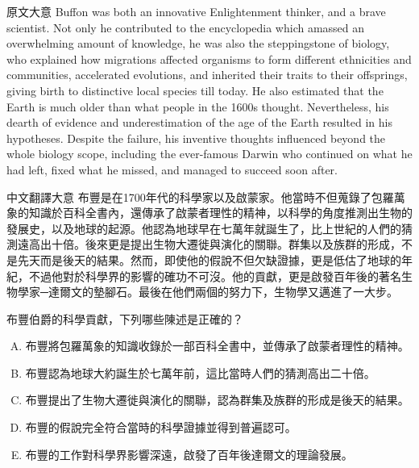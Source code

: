 \documentclass[
	a4paper,
	fontsize=11pt,
	twoside=true,
	numbers=noenddot,
]{article}
\begin{document}
\begin{large}
    \begin{boxpar}[SkyBlue]{原文大意}
Buffon was both an innovative Enlightenment thinker, and a brave
scientist. Not only he contributed to the encyclopedia which amassed an
overwhelming amount of knowledge, he was also the steppingstone of
biology, who explained how migrations affected organisms to form
different ethnicities and communities, accelerated evolutions, and
inherited their traits to their offsprings, giving birth to distinctive
local species till today. He also estimated that the Earth is much older
than what people in the 1600s thought. Nevertheless, his dearth of
evidence and underestimation of the age of the Earth resulted in his
hypotheses. Despite the failure, his inventive thoughts influenced
beyond the whole biology scope, including the ever-famous Darwin who
continued on what he had left, fixed what he missed, and managed to
succeed soon after.
\end{boxpar}
    \begin{boxpar}[SkyBlue]{中文翻譯大意}
布豐是在1700年代的科學家以及啟蒙家。他當時不但蒐錄了包羅萬象的知識於百科全書內，還傳承了啟蒙者理性的精神，以科學的角度推測出生物的發展史，以及地球的起源。他認為地球早在七萬年就誕生了，比上世紀的人們的猜測遠高出十倍。後來更是提出生物大遷徙與演化的關聯。群集以及族群的形成，不是先天而是後天的結果。然而，即使他的假說不但欠缺證據，更是低估了地球的年紀，不過他對於科學界的影響的確功不可沒。他的貢獻，更是啟發百年後的著名生物學家─達爾文的墊腳石。最後在他們兩個的努力下，生物學又邁進了一大步。
\end{boxpar}
\begin{tcolorbox}[title=多選題,colback=SkyBlue!5!white,colframe=SkyBlue!75!black]

布豐伯爵的科學貢獻，下列哪些陳述是正確的？\\

\begin{enumerate}[(A)]
    \item 布豐將包羅萬象的知識收錄於一部百科全書中，並傳承了啟蒙者理性的精神。
    \item 布豐認為地球大約誕生於七萬年前，這比當時人們的猜測高出二十倍。
    \item 布豐提出了生物大遷徙與演化的關聯，認為群集及族群的形成是後天的結果。
    \item 布豐的假說完全符合當時的科學證據並得到普遍認可。
    \item 布豐的工作對科學界影響深遠，啟發了百年後達爾文的理論發展。
\end{enumerate}


\end{tcolorbox}
\end{large}
\end{document}
